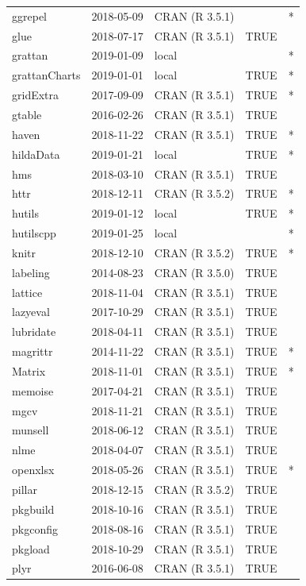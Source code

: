 \documentclass{grattan}\usepackage[]{graphicx}\usepackage[]{color}
\begin{document}
\begin{longtable}{lllll}
  ggrepel & 2018-05-09 & CRAN (R 3.5.1) &  & * \\ 
  glue & 2018-07-17 & CRAN (R 3.5.1) & TRUE &  \\ 
  grattan & 2019-01-09 & local &  & * \\ 
  grattanCharts & 2019-01-01 & local & TRUE & * \\ 
  gridExtra & 2017-09-09 & CRAN (R 3.5.1) & TRUE & * \\ 
  gtable & 2016-02-26 & CRAN (R 3.5.1) & TRUE &  \\ 
  haven & 2018-11-22 & CRAN (R 3.5.1) & TRUE & * \\ 
  hildaData & 2019-01-21 & local & TRUE & * \\ 
  hms & 2018-03-10 & CRAN (R 3.5.1) & TRUE &  \\ 
  httr & 2018-12-11 & CRAN (R 3.5.2) & TRUE & * \\ 
  hutils & 2019-01-12 & local & TRUE & * \\ 
  hutilscpp & 2019-01-25 & local &  & * \\ 
  knitr & 2018-12-10 & CRAN (R 3.5.2) & TRUE & * \\ 
  labeling & 2014-08-23 & CRAN (R 3.5.0) & TRUE &  \\ 
  lattice & 2018-11-04 & CRAN (R 3.5.1) & TRUE &  \\ 
  lazyeval & 2017-10-29 & CRAN (R 3.5.1) & TRUE &  \\ 
  lubridate & 2018-04-11 & CRAN (R 3.5.1) & TRUE &  \\ 
  magrittr & 2014-11-22 & CRAN (R 3.5.1) & TRUE & * \\ 
  Matrix & 2018-11-01 & CRAN (R 3.5.1) & TRUE & * \\ 
  memoise & 2017-04-21 & CRAN (R 3.5.1) & TRUE &  \\ 
  mgcv & 2018-11-21 & CRAN (R 3.5.1) & TRUE &  \\ 
  munsell & 2018-06-12 & CRAN (R 3.5.1) & TRUE &  \\ 
  nlme & 2018-04-07 & CRAN (R 3.5.1) & TRUE &  \\ 
  openxlsx & 2018-05-26 & CRAN (R 3.5.1) & TRUE & * \\ 
  pillar & 2018-12-15 & CRAN (R 3.5.2) & TRUE &  \\ 
  pkgbuild & 2018-10-16 & CRAN (R 3.5.1) & TRUE &  \\ 
  pkgconfig & 2018-08-16 & CRAN (R 3.5.1) & TRUE &  \\ 
  pkgload & 2018-10-29 & CRAN (R 3.5.1) & TRUE &  \\ 
  plyr & 2016-06-08 & CRAN (R 3.5.1) & TRUE &  \\ 

\end{longtable}
\end{document}
